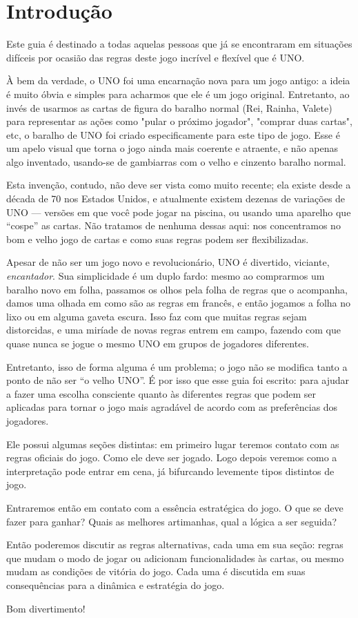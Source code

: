 \section*{Introdução}

Este guia é destinado a todas aquelas pessoas que já se encontraram em situações difíceis por ocasião das regras deste jogo incrível e flexível que é UNO.

À bem da verdade, o UNO foi uma encarnação nova para um jogo antigo: a ideia é muito óbvia e simples para acharmos que ele é um jogo original. Entretanto, ao invés de usarmos as cartas de figura do baralho normal (Rei, Rainha, Valete) para representar as ações como "pular o próximo jogador", "comprar duas cartas", etc, o baralho de UNO foi criado especificamente para este tipo de jogo. Esse é um apelo visual que torna o jogo ainda mais coerente e atraente, e não apenas algo inventado, usando-se de gambiarras com o velho e cinzento baralho normal.

Esta invenção, contudo, não deve ser vista como muito recente; ela existe desde a década de 70 nos Estados Unidos, e atualmente existem dezenas de variações de UNO --- versões em que você pode jogar na piscina, ou usando uma aparelho que ``cospe'' as cartas. Não tratamos de nenhuma dessas aqui: nos concentramos no bom e velho jogo de cartas e como suas regras podem ser flexibilizadas.

Apesar de não ser um jogo novo e revolucionário, UNO é divertido, viciante, \textit{encantador}. Sua simplicidade é um duplo fardo: mesmo ao comprarmos um baralho novo em folha, passamos os olhos pela folha de regras que o acompanha, damos uma olhada em como são as regras em francês, e então jogamos a folha no lixo ou em alguma gaveta escura. Isso faz com que muitas regras sejam distorcidas, e uma miríade de novas regras entrem em campo, fazendo com que quase nunca se jogue o mesmo UNO em grupos de jogadores diferentes.

Entretanto, isso de forma alguma é um problema; o jogo não se modifica tanto a ponto de não ser ``o velho UNO''. É por isso que esse guia foi escrito: para ajudar a fazer uma escolha consciente quanto às diferentes regras que podem ser aplicadas para tornar o jogo mais agradável de acordo com as preferências dos jogadores.

Ele possui algumas seções distintas: em primeiro lugar teremos contato com as regras oficiais do jogo. Como ele deve ser jogado. Logo depois veremos como a interpretação pode entrar em cena, já bifurcando levemente tipos distintos de jogo.

Entraremos então em contato com a essência estratégica do jogo. O que se deve fazer para ganhar? Quais as melhores artimanhas, qual a lógica a ser seguida?

Então poderemos discutir as regras alternativas, cada uma em sua seção: regras que mudam o modo de jogar ou adicionam funcionalidades às cartas, ou mesmo mudam as condições de vitória do jogo. Cada uma é discutida em suas consequências para a dinâmica e estratégia do jogo.

Bom divertimento!